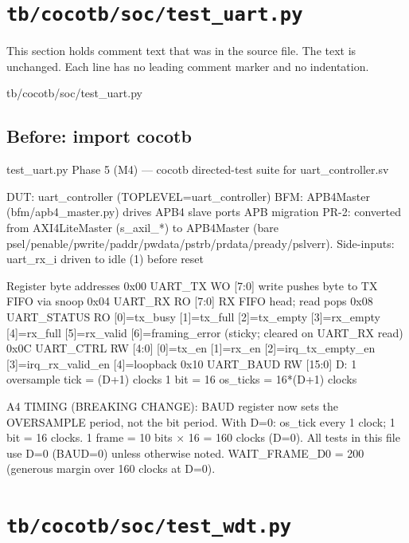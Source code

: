 \section{\texttt{tb/cocotb/soc/test\_uart.py}}\label{tm:suite:soc-test-uart}

This section holds comment text that was in the source file. The text is unchanged. Each line has no leading comment marker and no indentation.

\begin{relocated}{tb/cocotb/soc/test_uart.py}

\subsection*{Before: import cocotb}

\begin{textblock}
test_uart.py
Phase 5 (M4) — cocotb directed-test suite for uart_controller.sv

DUT:  uart_controller  (TOPLEVEL=uart_controller)
BFM:  APB4Master (bfm/apb4_master.py) drives APB4 slave ports
       APB migration PR-2: converted from AXI4LiteMaster (s_axil_*) to
       APB4Master (bare psel/penable/pwrite/paddr/pwdata/pstrb/prdata/pready/pslverr).
Side-inputs: uart_rx_i driven to idle (1) before reset

Register byte addresses
  0x00  UART_TX     WO [7:0]  write pushes byte to TX FIFO via snoop
  0x04  UART_RX     RO [7:0]  RX FIFO head; read pops
  0x08  UART_STATUS RO        [0]=tx_busy [1]=tx_full [2]=tx_empty
                              [3]=rx_empty [4]=rx_full [5]=rx_valid
                              [6]=framing_error (sticky; cleared on UART_RX read)
  0x0C  UART_CTRL   RW [4:0]  [0]=tx_en [1]=rx_en [2]=irq_tx_empty_en
                              [3]=irq_rx_valid_en [4]=loopback
  0x10  UART_BAUD   RW [15:0] D: 1 oversample tick = (D+1) clocks
                              1 bit = 16 os_ticks = 16*(D+1) clocks

A4 TIMING (BREAKING CHANGE):
  BAUD register now sets the OVERSAMPLE period, not the bit period.
  With D=0: os_tick every 1 clock; 1 bit = 16 clocks.
  1 frame = 10 bits × 16 = 160 clocks (D=0).
  All tests in this file use D=0 (BAUD=0) unless otherwise noted.
  WAIT_FRAME_D0 = 200 (generous margin over 160 clocks at D=0).
\end{textblock}

\end{relocated}

\section{\texttt{tb/cocotb/soc/test\_wdt.py}}\label{tm:suite:soc-test-wdt}

